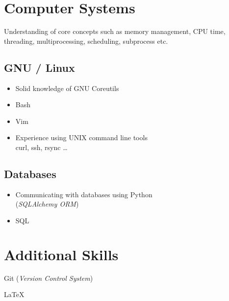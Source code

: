 \documentclass[a4paper, 13pt, draft]{article}
\begin{document}
\section*{\color{col1} \Large{Computer Systems} \color{default}}

Understanding of core concepts such as memory management, CPU time,
threading, multiprocessing, scheduling, subprocess etc.

\begin{multicols}{2}
    \subsection*{GNU / Linux}
    \begin{itemize}
	\setlength\itemsep{0em}
    \item Solid knowledge of GNU Coreutils
    \item Bash
    \item Vim
    \item Experience using UNIX command line tools \\
	curl, ssh, rsync \dots
\end{itemize}

\subsection*{Databases}

\begin{itemize}
    \setlength\itemsep{0em}
\item Communicating with databases using Python \\ (\textit{SQLAlchemy ORM})
\item SQL \\
\end{itemize}

\end{multicols}

\section*{\color{col1} Additional Skills \color{default}}

\begin{itemize}
    \begin{multicols}{2}
    \item Git (\textit{Version Control System})
    \item \LaTeX
    \end{multicols}
\end{itemize}
\end{document}
